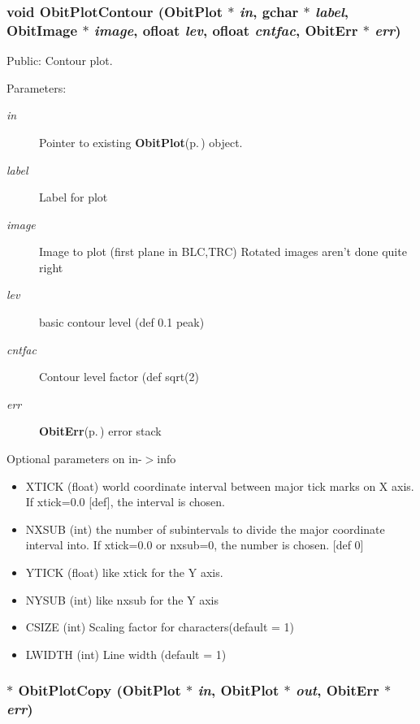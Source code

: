 \subsubsection{\setlength{\rightskip}{0pt plus 5cm}void Obit\-Plot\-Contour ({\bf Obit\-Plot} $\ast$ {\em in}, gchar $\ast$ {\em label}, {\bf Obit\-Image} $\ast$ {\em image}, {\bf ofloat} {\em lev}, {\bf ofloat} {\em cntfac}, {\bf Obit\-Err} $\ast$ {\em err})}\label{ObitPlot_8h_a12}


Public: Contour plot. 

\begin{Desc}
\item[Parameters:]
\begin{description}
\item[{\em in}]Pointer to existing {\bf Obit\-Plot}{\rm (p.\,\pageref{structObitPlot})} object. \item[{\em label}]Label for plot \item[{\em image}]Image to plot (first plane in BLC,TRC) Rotated images aren't done quite right \item[{\em lev}]basic contour level (def 0.1 peak) \item[{\em cntfac}]Contour level factor (def sqrt(2) \item[{\em err}]{\bf Obit\-Err}{\rm (p.\,\pageref{structObitErr})} error stack\end{description}
\end{Desc}
Optional parameters on in-$>$info \begin{itemize}
\item XTICK (float) world coordinate interval between major tick marks on X axis. If xtick=0.0 [def], the interval is chosen. \item NXSUB (int) the number of subintervals to divide the major coordinate interval into. If xtick=0.0 or nxsub=0, the number is chosen. [def 0] \item YTICK (float) like xtick for the Y axis. \item NYSUB (int) like nxsub for the Y axis \item CSIZE (int) Scaling factor for characters(default = 1) \item LWIDTH (int) Line width (default = 1) \end{itemize}
\subsubsection{$\ast$ Obit\-Plot\-Copy ({\bf Obit\-Plot} $\ast$ {\em in}, {\bf Obit\-Plot} $\ast$ {\em out}, {\bf Obit\-Err} $\ast$ {\em err})}\label{ObitPlot_8h_a7}


